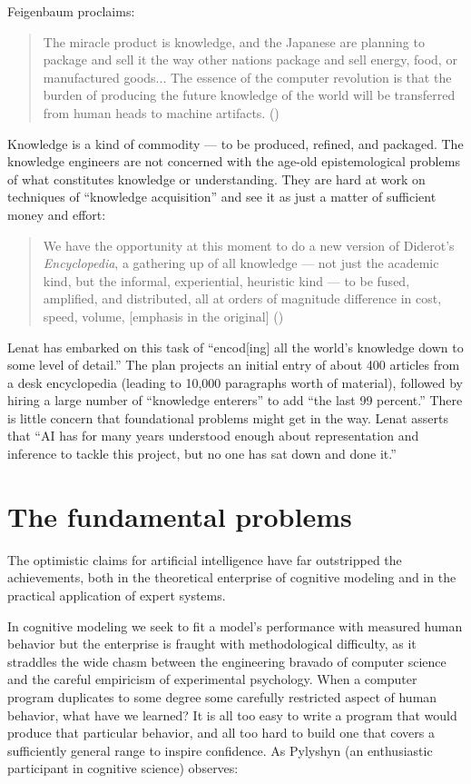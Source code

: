 \documentclass[12pt]{article}
\def\bq{\begin{quote}}
\def\eq{\end{quote}}
\begin{document}
Feigenbaum proclaims:

\bq
The miracle product is knowledge, and the Japanese are planning to package and sell it the way other nations package and sell energy, food, or manufactured goods... The essence of the computer revolution is that the burden of producing the future knowledge of the world will be transferred from human heads to machine artifacts. ({\it \cite{mccorduck1983}})
\eq

Knowledge is a kind of commodity --- to be produced, refined, and packaged. The knowledge engineers are not concerned with the age-old epistemological problems of what constitutes knowledge or understanding. They are hard at work on techniques of ``knowledge acquisition'' and see it as just a matter of sufficient money and effort:

\bq
We have the opportunity at this moment to do a new version of Diderot's {\it Encyclopedia}, a gathering up of all knowledge --- not just the academic kind, but the informal, experiential, heuristic kind --- to be fused, amplified, and distributed, all at orders of magnitude difference in cost, speed, volume, [emphasis in the original]  ({\it \cite{mccorduck1983}})
\eq

Lenat has embarked on this task of ``encod[ing] all the world's knowledge
down to some level of detail.'' The plan projects an initial entry of
about 400 articles from a desk encyclopedia (leading to 10,000
paragraphs worth of material), followed by hiring a large number of
``knowledge enterers'' to add ``the last 99 percent.'' There is little
concern that foundational problems might get in the way. Lenat asserts
that ``AI has for many years understood enough about representation and
inference to tackle this project, but no one has sat down and done
it.''

\section{The fundamental problems}

The optimistic claims for artificial intelligence have far outstripped the achievements, both in the theoretical enterprise of cognitive modeling and in the practical application of expert systems. 

In cognitive modeling we seek to fit a model's performance with measured human behavior but the enterprise is fraught with methodological difficulty, as it straddles the wide chasm between the engineering bravado of computer science and the careful empiricism of experimental psychology. When a computer program duplicates to some degree some carefully restricted aspect of human behavior, what have we learned? It is all too easy to write a program that would produce that particular behavior, and all too hard to build one that covers a sufficiently general range to inspire confidence. As Pylyshyn (an enthusiastic participant in cognitive science) observes:
\end{document}
